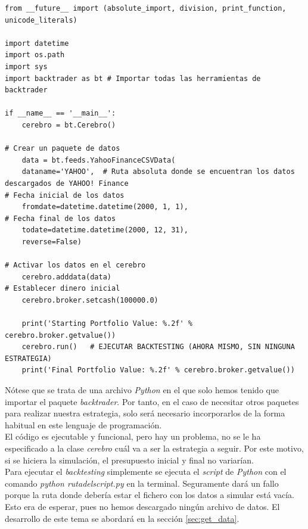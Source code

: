 		\begin{lstlisting}[basicstyle=\tiny]
from __future__ import (absolute_import, division, print_function, unicode_literals)
		
import datetime
import os.path
import sys
import backtrader as bt # Importar todas las herramientas de backtrader
		
if __name__ == '__main__':
	cerebro = bt.Cerebro()
		
# Crear un paquete de datos
	data = bt.feeds.YahooFinanceCSVData(
	dataname='YAHOO',  # Ruta absoluta donde se encuentran los datos descargados de YAHOO! Finance
# Fecha inicial de los datos
	fromdate=datetime.datetime(2000, 1, 1),
# Fecha final de los datos
	todate=datetime.datetime(2000, 12, 31),
	reverse=False)
		
# Activar los datos en el cerebro
	cerebro.adddata(data)
# Establecer dinero inicial    
	cerebro.broker.setcash(100000.0)
		
	print('Starting Portfolio Value: %.2f' % cerebro.broker.getvalue())
	cerebro.run()   # EJECUTAR BACKTESTING (AHORA MISMO, SIN NINGUNA ESTRATEGIA)
	print('Final Portfolio Value: %.2f' % cerebro.broker.getvalue())
		\end{lstlisting}
		
		\vspace{0.5cm}
		
		N\'otese que se trata de una archivo \textit{Python} en el que solo hemos tenido que importar el paquete \textit{backtrader}. Por tanto, en el caso de necesitar otros paquetes para realizar nuestra estrategia, solo ser\'a necesario incorporarlos de la forma habitual en este lenguaje de programaci\'on.\\
		
		El c\'odigo es ejecutable y funcional, pero hay un problema, no se le ha especificado a la clase \textit{cerebro} cu\'al va a ser la estrategia a seguir. Por este motivo, si se hiciera la simulaci\'on, el presupuesto inicial y final no variar\'ian. \\
		
		Para ejecutar el \textit{backtesting} simplemente se ejecuta el \textit{script} de \textit{Python} con el comando \textit{python rutadelscript.py} en la terminal. Seguramente dar\'a un fallo porque la ruta donde deber\'ia estar el fichero con los datos a simular est\'a vac\'ia. Esto era de esperar, pues no hemos descargado ning\'un archivo de datos. El desarrollo de este tema se abordar\'a en la secci\'on \ref{sec:get_data}.\\
		

